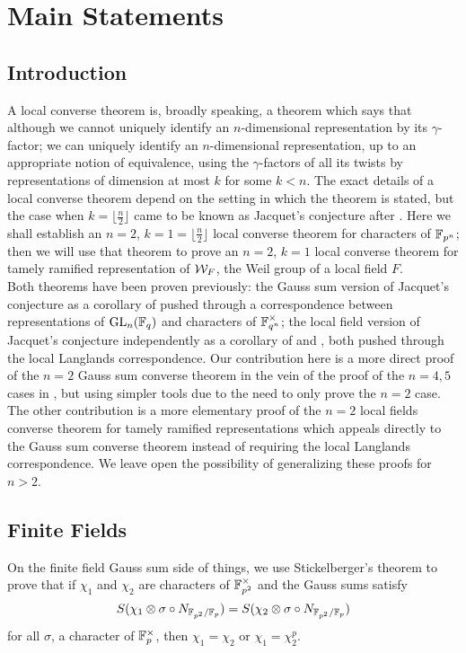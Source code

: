 \chapter{Main Statements}	%

\section{Introduction}

A local converse theorem is, broadly speaking, a theorem which says that although we cannot uniquely identify an $n$-dimensional representation by its $\gamma$-factor; we can uniquely identify an $n$-dimensional representation, up to an appropriate notion of equivalence, using the $\gamma$-factors of all its twists by representations of dimension at most $k$ for some $k < n$.
The exact details of a local converse theorem depend on the setting in which the theorem is stated, but the case when $k = \lfloor \frac{n}{2} \rfloor$ came to be known as Jacquet's conjecture after \cite{Jacquet1983}.
Here we shall establish an $n = 2$, $k=1 = \lfloor \frac{n}{2}\rfloor$ local converse theorem for characters of $\mathbb{F}_{p^n}$; then we will use that theorem to prove an $n=2$, $k=1$ local converse theorem for tamely ramified representation of $\mathcal{W}_F$, the Weil group of a local field $F$.
\\

Both theorems have been proven previously: the Gauss sum version of Jacquet's conjecture as a corollary of  \cite{Nien2014} pushed through a correspondence between representations of $\textrm{GL}_n(\mathbb{F}_q)$ and characters of $\mathbb{F}_{q^n}^\times$; the local field version of Jacquet's conjecture independently as a corollary of \cite{Jacquet2017} and \cite{Chai2016}, both pushed through the local Langlands correspondence.
Our contribution here is a more direct proof of the $n=2$ Gauss sum converse theorem in the vein of the proof of the $n = 4, 5$ cases in  \cite{Nien2018}, but using simpler tools due to the need to only prove the $n=2$ case.
The other contribution is a more elementary proof of the $n=2$ local fields converse theorem for tamely ramified representations which appeals directly to the Gauss sum converse theorem instead of requiring the local Langlands correspondence.
We leave open the possibility of generalizing these proofs for $n > 2$.
\\

\section{Finite Fields}
On the finite field Gauss sum side of things, we use Stickelberger's theorem to prove that if $\chi_1$ and $\chi_2$ are characters of $\mathbb{F}_{p^2}^\times$ and the Gauss sums satisfy
\[S(\chi_1 \otimes \sigma \circ N_{\mathbb{F}_{p^2} / \mathbb{F}_p}) = S(\chi_2 \otimes \sigma \circ N_{\mathbb{F}_{p^2} / \mathbb{F}_p})\]
for all $\sigma$, a character of $\mathbb{F}_p^\times$, then $\chi_1 = \chi_2$ or $\chi_1 = \chi_2^p$.
\\

